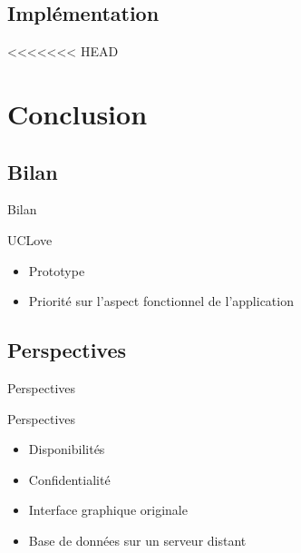 \documentclass{beamer}
\begin{document}
\subsection{Implémentation}
<<<<<<< HEAD

\section{Conclusion}

\subsection{Bilan}
\begin{frame}{Bilan}
\begin{block}{UCLove}
    \begin{itemize}
        \item{
            Prototype
        }
        \item{
            Priorité sur l'aspect fonctionnel de l'application
        }
    \end{itemize}
\end{block}
\end{frame}

\subsection{Perspectives}
\begin{frame}{Perspectives}
\begin{block}{Perspectives}
	\begin{itemize}
		\item{
			Disponibilités
		}
		\item{
			Confidentialité
		}
		\item{
			Interface graphique originale
		}
		\item{
			Base de données sur un serveur distant
		}
	\end{itemize}
\end{block}
\end{frame}
\end{document}
